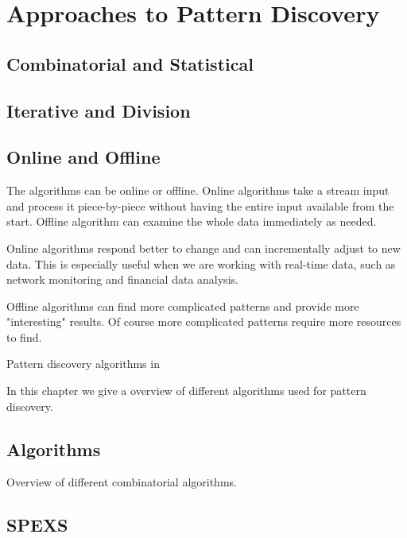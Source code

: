 \chapter{Approaches to Pattern Discovery}
\label{c:algorithms}

\WIP

\section{Combinatorial and Statistical}



\section{Iterative and Division}



\section{Online and Offline}

The algorithms can be online or offline. Online algorithms take a stream input and process it piece-by-piece without having the entire input available from the start. Offline algorithm can examine the whole data immediately as needed.

Online algorithms respond better to change and can incrementally adjust to new data. This is especially useful when we are working with real-time data, such as network monitoring and financial data analysis.

Offline algorithms can find more complicated patterns and provide more "interesting" results. Of course more complicated patterns require more resources to find.

Pattern discovery algorithms in 


In this chapter we give a overview of different algorithms used for pattern discovery.


\section{Algorithms}

Overview of different combinatorial algorithms.

\section{SPEXS}

